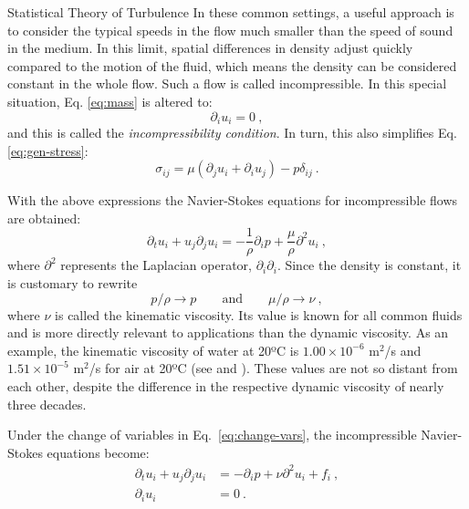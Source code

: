 \begin{chapter}{Statistical Theory of Turbulence}
In these common settings, a useful approach is to consider
the typical speeds in the flow much smaller than the speed
of sound in the medium. In this limit,
spatial differences in density adjust quickly compared to the motion of the
fluid, which means the density can be considered constant in the whole
flow. Such a flow is called incompressible.
In this special situation, Eq. \eqref{eq:mass} is altered to:
\begin{equation} \label{eq:incompressibility}
    \partial_i u_i = 0 \ ,
\end{equation}
and this is called the \textit{incompressibility condition}.
In turn, this also simplifies Eq. \eqref{eq:gen-stress}:
\begin{equation}
    \sigma_{ij} = \mu (\partial_j u_i + \partial_i u_j ) - p \delta_{ij}\ .
\end{equation}

With the above expressions the Navier-Stokes equations
for incompressible flows are obtained:
\begin{equation}
    \partial_t u_i + u_j \partial_j u_i
    = - \frac{1}{\rho} \partial_i p + \frac{\mu}{\rho} \partial^2 u_i \ ,
\end{equation}
where $\partial^2$ represents the Laplacian operator, $\partial_i \partial_i$.
Since the density is constant, it is customary to rewrite
\begin{equation} \label{eq:change-vars}
p/\rho \to p \qquad \mbox{and} \qquad \mu/\rho \to \nu \ ,
\end{equation}
where $\nu$ is called the kinematic viscosity.
Its value is known for all common fluids and is more directly relevant
to applications than the dynamic viscosity.
As an example, the kinematic viscosity of water at 20ºC is
$1.00 \times 10^{-6}$ m$^2$/s and $1.51 \times 10^{-5}$ m$^2$/s for air at 20ºC
(see \textcite{visc-water} and \textcite{visc-air}).
These values are not so distant from each other, despite the difference in the respective dynamic viscosity of nearly three decades.

Under the change of variables in Eq.~\eqref{eq:change-vars},
the incompressible Navier-Stokes equations become:
\begin{equation} \label{eq:ns}
\begin{split}
    \partial_t u_i + u_j \partial_j u_i
    &= - \partial_i p + \nu \partial^2 u_i + f_i \ , \\
    \partial_i u_i &= 0 \ .
\end{split}
\end{equation}


\end{chapter}
